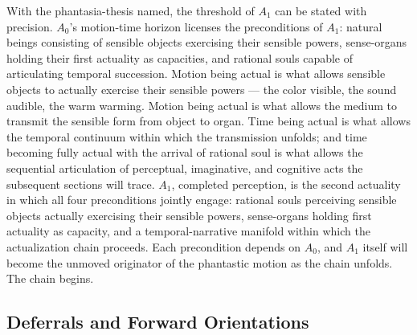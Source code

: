 \documentclass{article}
\begin{document}
With the phantasia-thesis named, the threshold of $A_1$ can be stated with precision. $A_0$'s motion-time horizon licenses the preconditions of $A_1$: natural beings consisting of sensible objects exercising their sensible powers, sense-organs holding their first actuality as capacities, and rational souls capable of articulating temporal succession. Motion being actual is what allows sensible objects to actually exercise their sensible powers --- the color visible, the sound audible, the warm warming. Motion being actual is what allows the medium to transmit the sensible form from object to organ. Time being actual is what allows the temporal continuum within which the transmission unfolds; and time becoming fully actual with the arrival of rational soul is what allows the sequential articulation of perceptual, imaginative, and cognitive acts the subsequent sections will trace. $A_1$, completed perception, is the second actuality in which all four preconditions jointly engage: rational souls perceiving sensible objects actually exercising their sensible powers, sense-organs holding first actuality as capacity, and a temporal-narrative manifold within which the actualization chain proceeds. Each precondition depends on $A_0$, and $A_1$ itself will become the unmoved originator of the phantastic motion as the chain unfolds. The chain begins.

\subsection*{Deferrals and Forward Orientations}
\end{document}
